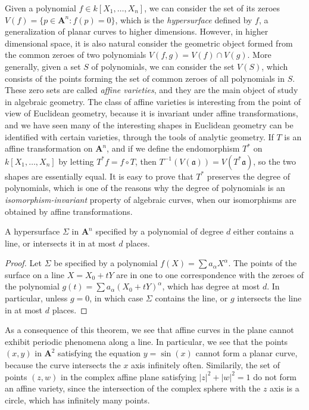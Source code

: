 Given a polynomial $f \in k[X_1, \dots, X_n]$, we can consider the set of its zeroes $V(f) = \{ p \in \mathbf{A}^n : f(p) = 0 \}$, which is the \emph{hypersurface} defined by $f$, a generalization of planar curves to higher dimensions. However, in higher dimensional space, it is also natural consider the geometric object formed from the common zeroes of two polynomials $V(f,g) = V(f) \cap V(g)$. More generally, given a set $S$ of polynomials, we can consider the set $V(S)$, which consists of the points forming the set of common zeroes of all polynomials in $S$. These zero sets are called \emph{affine varieties}, and they are the main object of study in algebraic geometry. The class of affine varieties is interesting from the point of view of Euclidean geometry, because it is invariant under affine transformations, and we have seen many of the interesting shapes in Euclidean geometry can be identified with certain varieties, through the tools of analytic geometry. If $T$ is an affine transformation on $\mathbf{A}^n$, and if we define the endomorphism $T^*$ on $k[X_1, \dots, X_n]$ by letting $T^*f = f \circ T$, then $T^{-1}(V(\mathfrak{a})) = V(T^* \mathfrak{a})$, so the two shapes are essentially equal. It is easy to prove that $T^*$ preserves the degree of polynomials, which is one of the reasons why the degree of polynomials is an {\it isomorphism-invariant} property of algebraic curves, when our isomorphisms are obtained by affine transformations.

\begin{theorem}
    A hypersurface $\Sigma$ in $\mathbf{A}^n$ specified by a polynomial of degree $d$ either contains a line, or intersects it in at most $d$ places.
\end{theorem}
\begin{proof}
    Let $\Sigma$ be specified by a polynomial $f(X) = \sum a_\alpha X^\alpha$. The points of the surface on a line $X = X_0 + t Y$ are in one to one correspondence with the zeroes of the polynomial $g(t) = \sum a_\alpha (X_0 + t Y)^\alpha$, which has degree at most $d$. In particular, unless $g = 0$, in which case $\Sigma$ contains the line, or $g$ intersects the line in at most $d$ places.
\end{proof}

As a consequence of this theorem, we see that affine curves in the plane cannot exhibit periodic phenomena along a line. In particular, we see that the points $(x,y)$ in $\mathbf{A}^2$ satisfying the equation $y = \sin(x)$ cannot form a planar curve, because the curve intersects the $x$ axis infinitely often. Similarily, the set of points $(z,w)$ in the complex affine plane satisfying $|z|^2 + |w|^2 = 1$ do not form an affine variety, since the intersection of the complex sphere with the $z$ axis is a circle, which has infinitely many points.

